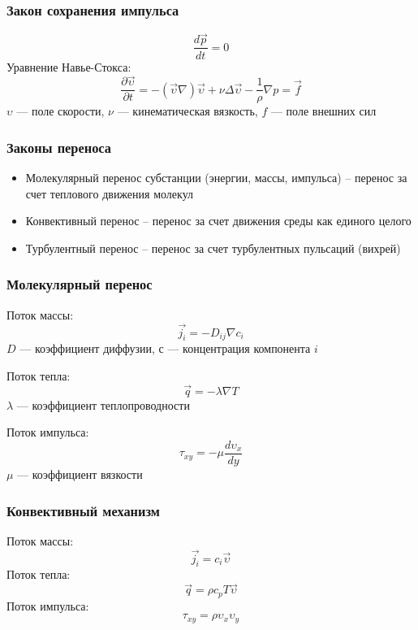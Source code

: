 \begin{frame}
	\frametitle{Закон сохранения импульса}
	\begin{equation}
	\dfrac{d \vec{p}}{d t }=0
	\end{equation}
	Уравнение Навье-Стокса:
	\begin{equation}
	\dfrac{\partial \vec{\upsilon}}{\partial t} = - (\vec{\upsilon} \nabla) \vec{\upsilon} +\nu \Delta \vec{\upsilon} - \dfrac{1}{\rho} \nabla p = \vec{f}
	\end{equation}
	$\upsilon$ --- поле скорости, $\nu$ --- кинематическая вязкость, $f$ --- поле внешних сил
\end{frame}


\begin{frame}
	\frametitle{Законы переноса}
	\begin{itemize}
	\item Молекулярный перенос субстанции (энергии, массы, импульса) – перенос за счет теплового движения молекул
	\item Конвективный перенос – перенос за счет движения среды как единого целого
	\item Турбулентный перенос – перенос за счет турбулентных пульсаций (вихрей)
	\end{itemize}
\end{frame}

\begin{frame}
	\frametitle{Молекулярный перенос}
	Поток массы:
	\begin{equation}
		\vec{j_i} = -D_{ij}\nabla c_i
	\end{equation}
	$D$ --- коэффициент диффузии, $с$ --- концентрация компонента $i$
	
	Поток тепла:
	\begin{equation}
	\vec{q} = -\lambda\nabla T
	\end{equation}
	$\lambda$ --- коэффициент теплопроводности
	
	Поток импульса:
	\begin{equation}
	\tau_{xy} = -\mu \dfrac{d \upsilon_x}{d y}
	\end{equation}
	$\mu$ --- коэффициент вязкости
	
\end{frame}

\begin{frame}
	\frametitle{Конвективный механизм}
	Поток массы:
	\begin{equation}
		\vec{j_i} = c_i \vec{\upsilon}
	\end{equation}
	Поток тепла:
	\begin{equation}
		\vec{q} = \rho c_p T \vec{\upsilon}
	\end{equation}
	Поток импульса:
	\begin{equation}
		\tau_{xy} = \rho  \upsilon_x \upsilon_y
	\end{equation}
	
\end{frame}

